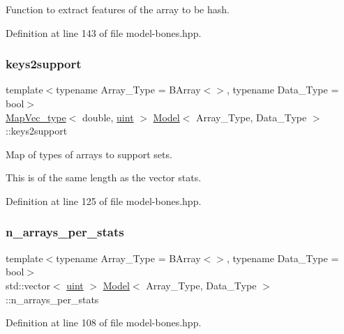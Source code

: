 Function to extract features of the array to be hash. 



Definition at line 143 of file model-\/bones.\+hpp.

\mbox{\label{class_model_a83d72b83e29ccaf09a5a05d2a67d0f05}} 
\subsubsection{\texorpdfstring{keys2support}{keys2support}}
{\footnotesize\ttfamily template$<$typename Array\+\_\+\+Type  = B\+Array$<$$>$, typename Data\+\_\+\+Type  = bool$>$ \\
\hyperlink{typedefs_8hpp_a02ed8dec96bc528c8bc3d8cb3c4674a5}{Map\+Vec\+\_\+type}$<$ double, \hyperlink{typedefs_8hpp_a91ad9478d81a7aaf2593e8d9c3d06a14}{uint} $>$ \hyperlink{class_model}{Model}$<$ Array\+\_\+\+Type, Data\+\_\+\+Type $>$\+::keys2support}



Map of types of arrays to support sets. 

This is of the same length as the vector {\ttfamily stats}. 

Definition at line 125 of file model-\/bones.\+hpp.

\mbox{\label{class_model_ab43351423d375b537a1a6a497c65caa1}} 
\subsubsection{\texorpdfstring{n\+\_\+arrays\+\_\+per\+\_\+stats}{n\_arrays\_per\_stats}}
{\footnotesize\ttfamily template$<$typename Array\+\_\+\+Type  = B\+Array$<$$>$, typename Data\+\_\+\+Type  = bool$>$ \\
std\+::vector$<$ \hyperlink{typedefs_8hpp_a91ad9478d81a7aaf2593e8d9c3d06a14}{uint} $>$ \hyperlink{class_model}{Model}$<$ Array\+\_\+\+Type, Data\+\_\+\+Type $>$\+::n\+\_\+arrays\+\_\+per\+\_\+stats}



Definition at line 108 of file model-\/bones.\+hpp.

\mbox{\label{class_model_ad4ec6d7a19e7a47fb6ffabbf191e1877}} 
